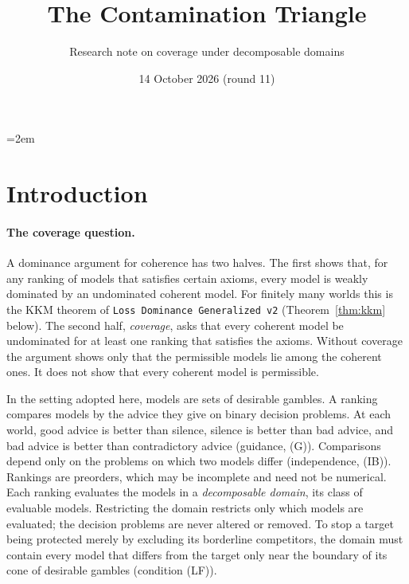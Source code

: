\documentclass[11pt]{article}
\title{The Contamination Triangle}
\author{Research note on coverage under decomposable domains}
\date{14 October 2026 (round 11)}
\theoremstyle{definition}
\theoremstyle{remark}
\newcommand{\src}[1]{\texttt{#1}}
\begin{document}
\emergencystretch=2em
\maketitle

\section{Introduction}\label{sec:intro}

\paragraph{The coverage question.}
A dominance argument for coherence has two halves. The first shows that, for any ranking of models that satisfies certain axioms, every model is weakly dominated by an undominated coherent model. For finitely many worlds this is the KKM theorem of \src{Loss Dominance Generalized v2} (Theorem~\ref{thm:kkm} below). The second half, \emph{coverage}, asks that every coherent model be undominated for at least one ranking that satisfies the axioms. Without coverage the argument shows only that the permissible models lie among the coherent ones. It does not show that every coherent model is permissible.

In the setting adopted here, models are sets of desirable gambles. A ranking compares models by the advice they give on binary decision problems. At each world, good advice is better than silence, silence is better than bad advice, and bad advice is better than contradictory advice (guidance, (G)). Comparisons depend only on the problems on which two models differ (independence, (IB)). Rankings are preorders, which may be incomplete and need not be numerical. Each ranking evaluates the models in a \emph{decomposable domain}, its class of evaluable models. Restricting the domain restricts only which models are evaluated; the decision problems are never altered or removed. To stop a target being protected merely by excluding its borderline competitors, the domain must contain every model that differs from the target only near the boundary of its cone of desirable gambles (condition (LF)).
\end{document}
